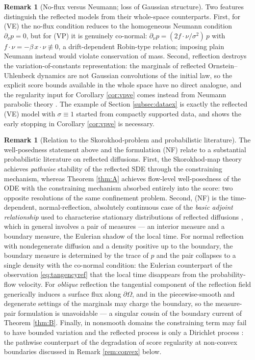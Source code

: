 \documentclass[11pt]{amsart}
\theoremstyle{definition}
\newtheorem{remark}[theorem]{Remark}
\begin{document}
\begin{remark}[No-flux versus Neumann; loss of Gaussian structure]
\label{rem:vpve}
Two features distinguish the reflected models from their whole-space
counterparts. First, for (VE) the no-flux condition reduces to the
homogeneous Neumann condition $\partial_\nu p=0$, but for (VP) it is
genuinely co-normal: $\partial_\nu p=(2f\cdot\nu/\sigma^2)\,p$ with
$f\cdot\nu=-\beta\,x\cdot\nu\not\equiv0$, a drift-dependent
Robin-type relation; imposing plain Neumann instead would violate
conservation of mass. Second, reflection destroys the
variation-of-constants representation: the marginals of reflected
Ornstein--Uhlenbeck dynamics are not Gaussian convolutions of the
initial law, so the explicit score bounds available in the whole
space have no direct analogue, and the regularity input for Corollary
\ref{cor:vpve} comes instead from Neumann parabolic theory
\cite{LSU}. The example of Section \ref{subsec:dataex} is exactly the
reflected (VE) model with $\sigma\equiv1$ started from compactly
supported data, and shows the early stopping in Corollary
\ref{cor:vpve} is necessary.
\end{remark}

\begin{remark}[Relation to the Skorokhod-problem and
probabilistic literature]\label{rem:ramanan}
The well-posedness statement above and the formulation (NF) relate to a substantial probabilistic literature on reflected diffusions. First, the
Skorokhod-map theory \cite{burdzy2004,LionsSznitman,saisho1987,DupuisRamanan,RamananESP}
achieves \emph{pathwise} stability of the reflected SDE through the
constraining mechanism, whereas Theorem \ref{thm:A} achieves
flow-level well-posedness of the ODE with the constraining mechanism
absorbed entirely into the score: two opposite resolutions of the
same confinement problem. Second, (NF) is the time-dependent,
normal-reflection, absolutely continuous case of the \emph{basic
adjoint relationship} used to characterise stationary distributions
of reflected diffusions \cite{HarrisonWilliams,KangRamananStat},
which in general involves a pair of measures --- an interior measure
and a boundary measure, the Eulerian shadow of the local time. For
normal reflection with nondegenerate diffusion and a density
positive up to the boundary, the boundary measure is determined by
the trace of $p$ and the pair collapses to a single density with the
co-normal condition: the Eulerian counterpart of the observation
\eqref{eq:tangencyref} that the local time disappears from the
probability-flow velocity. For \emph{oblique} reflection the
tangential component of the reflection field generically induces a
surface flux along $\partial\Omega$, and in the piecewise-smooth and
degenerate settings of \cite{KangRamananSub,KangRamananStat} the
marginals may charge the boundary, so the measure-pair formulation
is unavoidable --- a singular cousin of the boundary current of
Theorem \ref{thm:B}. Finally, in
nonsmooth domains the constraining term may fail to have bounded
variation and the reflected process is only a Dirichlet process
\cite{KangRamananDir}: the pathwise counterpart of the degradation
of score regularity at non-convex boundaries discussed in Remark
\ref{rem:convex} below.
\end{remark}
\end{document}
